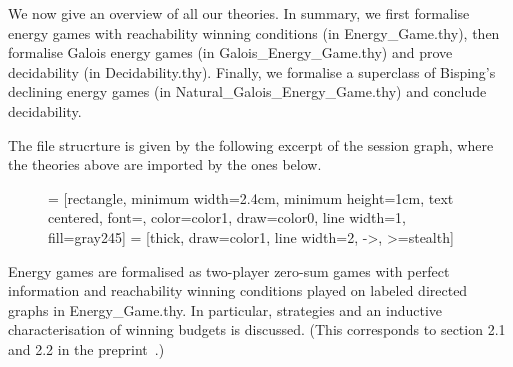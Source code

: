 We now give an overview of all our theories.
In summary, we first formalise energy games with reachability winning conditions (in Energy\_Game.thy), 
then formalise Galois energy games (in Galois\_Energy\_Game.thy) and prove decidability (in Decidability.thy).
Finally, we formalise a superclass of Bisping's declining energy games (in Natural\_Galois\_Energy\_Game.thy) and conclude decidability.

The file strucrture is given by the following excerpt of the session graph, where the theories above are imported by the ones below.

\begin{figure}[H]
\begin{center}


 = [rectangle, minimum width=2.4cm, minimum height=1cm, text centered, font=\normalsize, color=color1, draw=color0, line width=1, fill=gray245]
 = [thick, draw=color1, line width=2, ->, >=stealth]

\end{center}
\end{figure}

Energy games are formalised as two-player zero-sum games with perfect information and reachability winning conditions played on labeled directed graphs in Energy\_Game.thy. 
In particular, strategies and an inductive characterisation of winning budgets is discussed.
(This corresponds to section 2.1 and 2.2 in the preprint~\cite{preprint}.)

